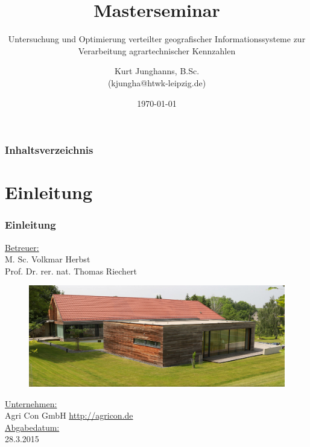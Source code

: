 \documentclass{beamer}
\begin{document}
\title{Masterseminar}
\subtitle{Untersuchung und Optimierung verteilter geografischer Informationssysteme zur Verarbeitung agrartechnischer Kennzahlen} 
\author{Kurt Junghanns, B.Sc. \\(kjungha@htwk-leipzig.de)} 
\date{\today}
 
\begin{frame}
\titlepage
\end{frame}

\begin{frame}
\frametitle{Inhaltsverzeichnis}\tableofcontents
\end{frame}

\section{Einleitung}
\begin{frame}\frametitle{Einleitung}
\underline{Betreuer:}\\
M. Sc. Volkmar Herbst\\
Prof. Dr. rer. nat. Thomas Riechert\\
\vspace{\baselineskip}
\begin{figure}\centering
    \includegraphics[scale=0.21]{Firma.png}
\end{figure}
\underline{Unternehmen:}\\
Agri Con GmbH \url{http://agricon.de}\\
\vspace{\baselineskip}
\underline{Abgabedatum:}\\
28.3.2015
\end{frame}
\end{document}
